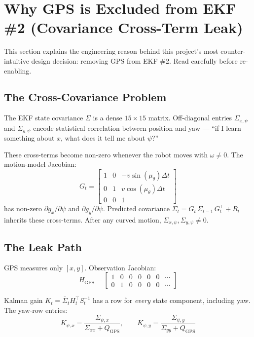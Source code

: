 \documentclass[11pt,a4paper]{article}
\begin{document}
\section{Why GPS is Excluded from EKF \#2 (Covariance Cross-Term Leak)}
\label{sec:gps-exclusion}

This section explains the engineering reason behind this project's most counter-intuitive design decision: removing GPS from EKF \#2. Read carefully before re-enabling.

\subsection{The Cross-Covariance Problem}

The EKF state covariance $\Sigma$ is a dense $15 \times 15$ matrix. Off-diagonal entries $\Sigma_{x,\psi}$ and $\Sigma_{y,\psi}$ encode statistical correlation between position and yaw --- ``if I learn something about $x$, what does it tell me about $\psi$?''

These cross-terms become non-zero whenever the robot moves with $\omega \neq 0$. The motion-model Jacobian:
\[
G_t = \begin{bmatrix} 1 & 0 & -v\sin(\mu_\theta)\Delta t \\ 0 & 1 & v\cos(\mu_\theta)\Delta t \\ 0 & 0 & 1 \end{bmatrix}
\]
has non-zero $\partial g_x / \partial \psi$ and $\partial g_y / \partial \psi$. Predicted covariance $\bar{\Sigma}_t = G_t\,\Sigma_{t-1}\,G_t^\top + R_t$ inherits these cross-terms. After any curved motion, $\Sigma_{x,\psi}, \Sigma_{y,\psi} \neq 0$.

\subsection{The Leak Path}

GPS measures only $[x, y]$. Observation Jacobian:
\[
H_{\text{GPS}} = \begin{bmatrix} 1 & 0 & 0 & 0 & 0 & 0 & \cdots \\ 0 & 1 & 0 & 0 & 0 & 0 & \cdots \end{bmatrix}
\]

Kalman gain $K_t = \bar{\Sigma}_t H_t^\top S_t^{-1}$ has a row for \emph{every} state component, including yaw. The yaw-row entries:
\[
K_{\psi, x} = \frac{\Sigma_{\psi,x}}{\Sigma_{xx} + Q_{\text{GPS}}}, \qquad K_{\psi, y} = \frac{\Sigma_{\psi,y}}{\Sigma_{yy} + Q_{\text{GPS}}}
\]
\end{document}
